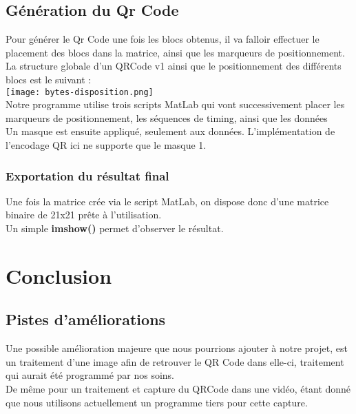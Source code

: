 \documentclass{report}
\begin{document}
	\section{Génération du Qr Code}

		Pour générer le Qr Code une fois les blocs obtenus, il va falloir effectuer le placement des blocs dans la matrice, ainsi que les marqueurs de positionnement.\\

		La structure globale d'un QRCode v1 ainsi que le positionnement des différents blocs est le suivant : \\

		\texttt{[image: bytes-disposition.png]}\\

		Notre programme utilise trois scripts MatLab qui vont successivement placer les marqueurs de positionnement, les séquences de timing, ainsi que les données\\
		
		Un masque est ensuite appliqué, seulement aux données. L'implémentation de l'encodage QR ici ne supporte que le masque 1.

		\subsection{Exportation du résultat final}

			Une fois la matrice crée via le script MatLab, on dispose donc d'une matrice binaire de 21x21 prête à l'utilisation.\\

			Un simple \textbf{imshow()} permet d'observer le résultat.\\

\chapter{Conclusion}

	\section{Pistes d'améliorations}

		Une possible amélioration majeure que nous pourrions ajouter à notre projet, est un traitement d'une image afin de retrouver le QR Code dans elle-ci, traitement qui aurait été programmé par nos soins.\\
		De même pour un traitement et capture du QRCode dans une vidéo, étant donné que nous utilisons actuellement un programme tiers pour cette capture.\\
\end{document}
